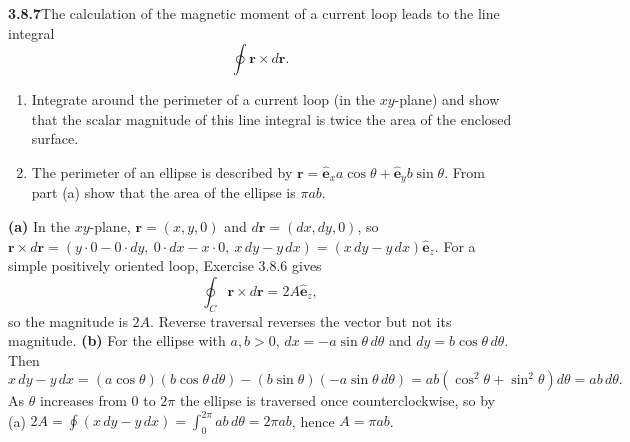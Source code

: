 \par\bigskip
\noindent\textbf{3.8.7}\quad The calculation of the magnetic moment of a
current loop leads to the line integral
\[
\oint\mathbf{r}\times d\mathbf{r}.
\]
\begin{enumerate}
\item[(a)] Integrate around the perimeter of a current loop (in the
  $xy$-plane) and show that the scalar magnitude of this line integral is
  twice the area of the enclosed surface.
\item[(b)] The perimeter of an ellipse is described by
  $\mathbf{r}=\hat{\mathbf{e}}_{x}a\cos\theta
  +\hat{\mathbf{e}}_{y}b\sin\theta$. From part (a) show that the area of the
  ellipse is $\pi ab$.
\end{enumerate}
\solution
\textbf{(a)} In the $xy$-plane, $\mathbf r=(x,y,0)$ and
$d\mathbf r=(dx,dy,0)$, so
$\mathbf r\times d\mathbf r=(y\cdot0-0\cdot dy,\ 0\cdot dx-x\cdot0,\
x\,dy-y\,dx)=(x\,dy-y\,dx)\hat{\mathbf e}_z$.
For a simple positively oriented loop, Exercise 3.8.6 gives
\[
\oint_C\mathbf r\times d\mathbf r=2A\hat{\mathbf e}_z,
\]
so the magnitude is $2A$. Reverse traversal reverses the vector but
not its magnitude.
\textbf{(b)} For the ellipse with $a,b>0$,
$dx=-a\sin\theta\,d\theta$ and $dy=b\cos\theta\,d\theta$.
Then
\[
x\,dy-y\,dx=(a\cos\theta)(b\cos\theta\,d\theta)
-(b\sin\theta)(-a\sin\theta\,d\theta)
=ab(\cos^2\theta+\sin^2\theta)d\theta=ab\,d\theta.
\]
As $\theta$ increases from $0$ to $2\pi$ the ellipse is traversed once
counterclockwise, so by (a)
$2A=\oint(x\,dy-y\,dx)=\int_0^{2\pi}ab\,d\theta=2\pi ab$, hence
$\boxed{A=\pi ab}$.

